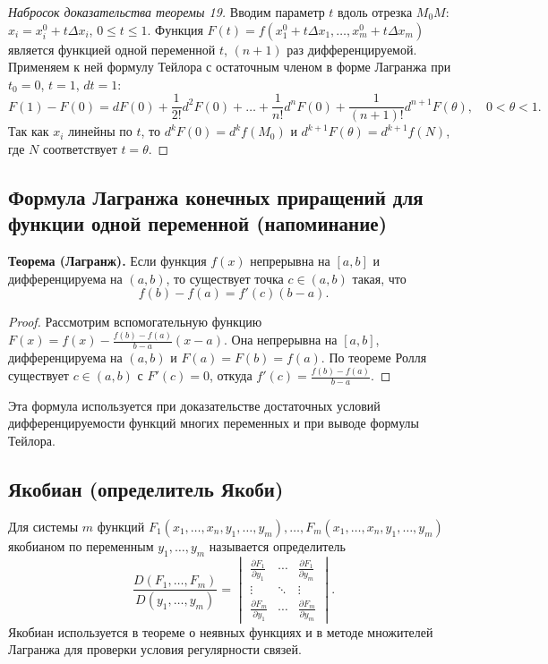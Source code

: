 \documentclass{article}
\theoremstyle{definition}
\begin{document}
\begin{proof}[Набросок доказательства теоремы 19]
Вводим параметр $t$ вдоль отрезка $M_0M$: $x_i=x_i^0+t\Delta x_i$, $0\le t\le1$. Функция $F(t)=f(x_1^0+t\Delta x_1,\dots,x_m^0+t\Delta x_m)$ является функцией одной переменной $t$, $(n+1)$ раз дифференцируемой. Применяем к ней формулу Тейлора с остаточным членом в форме Лагранжа при $t_0=0$, $t=1$, $dt=1$:
\[
F(1)-F(0)=dF(0)+\frac{1}{2!}d^2F(0)+\dots+\frac{1}{n!}d^nF(0)+\frac{1}{(n+1)!}d^{n+1}F(\theta),\quad 0<\theta<1.
\]
Так как $x_i$ линейны по $t$, то $d^kF(0)=d^kf(M_0)$ и $d^{k+1}F(\theta)=d^{k+1}f(N)$, где $N$ соответствует $t=\theta$.
\end{proof}

\subsection{Формула Лагранжа конечных приращений для функции одной переменной (напоминание)}
\textbf{Теорема (Лагранж).} Если функция $f(x)$ непрерывна на $[a,b]$ и дифференцируема на $(a,b)$, то существует точка $c\in(a,b)$ такая, что
\[
f(b)-f(a)=f'(c)(b-a).
\]
\begin{proof}
Рассмотрим вспомогательную функцию $F(x)=f(x)-\frac{f(b)-f(a)}{b-a}(x-a)$. Она непрерывна на $[a,b]$, дифференцируема на $(a,b)$ и $F(a)=F(b)=f(a)$. По теореме Ролля существует $c\in(a,b)$ с $F'(c)=0$, откуда $f'(c)=\frac{f(b)-f(a)}{b-a}$.
\end{proof}
Эта формула используется при доказательстве достаточных условий дифференцируемости функций многих переменных и при выводе формулы Тейлора.

\subsection{Якобиан (определитель Якоби)}
Для системы $m$ функций $F_1(x_1,\dots,x_n,y_1,\dots,y_m),\dots,F_m(x_1,\dots,x_n,y_1,\dots,y_m)$ якобианом по переменным $y_1,\dots,y_m$ называется определитель
\[
\frac{D(F_1,\dots,F_m)}{D(y_1,\dots,y_m)} = \begin{vmatrix}
\frac{\partial F_1}{\partial y_1} & \cdots & \frac{\partial F_1}{\partial y_m} \\
\vdots & \ddots & \vdots \\
\frac{\partial F_m}{\partial y_1} & \cdots & \frac{\partial F_m}{\partial y_m}
\end{vmatrix}.
\]
Якобиан используется в теореме о неявных функциях и в методе множителей Лагранжа для проверки условия регулярности связей.
\end{document}
